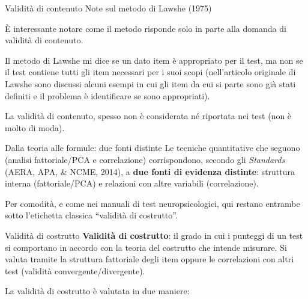 \documentclass[
  ignorenonframetext,
  aspectratio=169,
]{beamer}
\begin{document}
\begin{frame}{Validità di contenuto}
\label{validituxe0-di-contenuto-5}
Note sul metodo di Lawshe (1975)

È interessante notare come il metodo risponde solo in parte alla domanda
di validità di contenuto.

Il metodo di Lawshe mi dice se un dato item è appropriato per il test,
ma non se il test contiene tutti gli item necessari per i suoi scopi
(nell'articolo originale di Lawshe sono discussi alcuni esempi in cui
gli item da cui si parte sono già stati definiti e il problema è
identificare se sono appropriati).

La validità di contenuto, spesso non è considerata né riportata nei test
(non è molto di moda).
\end{frame}

\begin{frame}{Dalla teoria alle formule: due fonti distinte}
\label{dalla-teoria-alle-formule-due-fonti-distinte}
Le tecniche quantitative che seguono (analisi fattoriale/PCA e
correlazione) corrispondono, secondo gli \emph{Standards} (AERA, APA, \&
NCME, 2014), a \textbf{due fonti di evidenza distinte}: struttura
interna (fattoriale/PCA) e relazioni con altre variabili (correlazione).

Per comodità, e come nei manuali di test neuropsicologici, qui restano
entrambe sotto l'etichetta classica ``validità di costrutto''.
\end{frame}

\begin{frame}{Validità di costrutto}
\label{validituxe0-di-costrutto}
\textbf{Validità di costrutto}: il grado in cui i punteggi di un test si
comportano in accordo con la teoria del costrutto che intende misurare.
Si valuta tramite la struttura fattoriale degli item oppure le
correlazioni con altri test (validità convergente/divergente).

La validità di costrutto è valutata in due maniere:

\end{frame}
\end{document}
